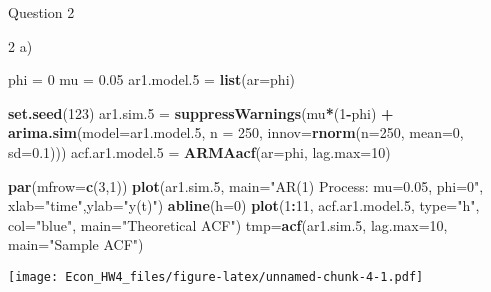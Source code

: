 \documentclass[]{article}
\newenvironment{Shaded}{\begin{snugshade}}{\end{snugshade}}
\newcommand{\KeywordTok}[1]{\textcolor[rgb]{0.13,0.29,0.53}{\textbf{#1}}}
\newcommand{\DataTypeTok}[1]{\textcolor[rgb]{0.13,0.29,0.53}{#1}}
\newcommand{\DecValTok}[1]{\textcolor[rgb]{0.00,0.00,0.81}{#1}}
\newcommand{\FloatTok}[1]{\textcolor[rgb]{0.00,0.00,0.81}{#1}}
\newcommand{\StringTok}[1]{\textcolor[rgb]{0.31,0.60,0.02}{#1}}
\newcommand{\OperatorTok}[1]{\textcolor[rgb]{0.81,0.36,0.00}{\textbf{#1}}}
\newcommand{\NormalTok}[1]{#1}
\begin{document}
Question 2

2 a)

\begin{Shaded}
\begin{Highlighting}[]
\NormalTok{phi =}\StringTok{ }\DecValTok{0} 
\NormalTok{mu  =}\StringTok{ }\FloatTok{0.05}
\NormalTok{ar1.model.}\DecValTok{5}\NormalTok{ =}\StringTok{ }\KeywordTok{list}\NormalTok{(}\DataTypeTok{ar=}\NormalTok{phi)}

\KeywordTok{set.seed}\NormalTok{(}\DecValTok{123}\NormalTok{)}
\NormalTok{ar1.sim.}\DecValTok{5}\NormalTok{ =}\StringTok{ }\KeywordTok{suppressWarnings}\NormalTok{(mu}\OperatorTok{*}\NormalTok{(}\DecValTok{1}\OperatorTok{-}\NormalTok{phi) }\OperatorTok{+}\StringTok{ }\KeywordTok{arima.sim}\NormalTok{(}\DataTypeTok{model=}\NormalTok{ar1.model.}\DecValTok{5}\NormalTok{, }\DataTypeTok{n =} \DecValTok{250}\NormalTok{,}
                             \DataTypeTok{innov=}\KeywordTok{rnorm}\NormalTok{(}\DataTypeTok{n=}\DecValTok{250}\NormalTok{, }\DataTypeTok{mean=}\DecValTok{0}\NormalTok{, }\DataTypeTok{sd=}\FloatTok{0.1}\NormalTok{)))}
\NormalTok{acf.ar1.model.}\DecValTok{5}\NormalTok{ =}\StringTok{ }\KeywordTok{ARMAacf}\NormalTok{(}\DataTypeTok{ar=}\NormalTok{phi, }\DataTypeTok{lag.max=}\DecValTok{10}\NormalTok{)}

\KeywordTok{par}\NormalTok{(}\DataTypeTok{mfrow=}\KeywordTok{c}\NormalTok{(}\DecValTok{3}\NormalTok{,}\DecValTok{1}\NormalTok{))}
    \KeywordTok{plot}\NormalTok{(ar1.sim.}\DecValTok{5}\NormalTok{, }\DataTypeTok{main=}\StringTok{"AR(1) Process: mu=0.05, phi=0"}\NormalTok{,}
           \DataTypeTok{xlab=}\StringTok{"time"}\NormalTok{,}\DataTypeTok{ylab=}\StringTok{"y(t)"}\NormalTok{)}
    \KeywordTok{abline}\NormalTok{(}\DataTypeTok{h=}\DecValTok{0}\NormalTok{)}
    \KeywordTok{plot}\NormalTok{(}\DecValTok{1}\OperatorTok{:}\DecValTok{11}\NormalTok{, acf.ar1.model.}\DecValTok{5}\NormalTok{, }\DataTypeTok{type=}\StringTok{"h"}\NormalTok{, }\DataTypeTok{col=}\StringTok{"blue"}\NormalTok{, }\DataTypeTok{main=}\StringTok{"Theoretical ACF"}\NormalTok{)}
\NormalTok{    tmp=}\KeywordTok{acf}\NormalTok{(ar1.sim.}\DecValTok{5}\NormalTok{, }\DataTypeTok{lag.max=}\DecValTok{10}\NormalTok{, }\DataTypeTok{main=}\StringTok{"Sample ACF"}\NormalTok{)}
\end{Highlighting}
\end{Shaded}

\texttt{[image: Econ\_HW4\_files/figure-latex/unnamed-chunk-4-1.pdf]}
\end{document}
